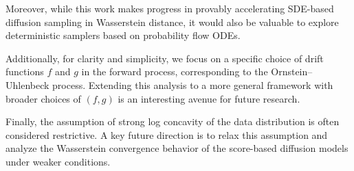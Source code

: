 \documentclass[11pt]{article}
\begin{document}
Moreover, while this work makes progress in provably accelerating SDE-based diffusion sampling in Wasserstein distance, it would also be valuable to explore deterministic samplers based on probability flow ODEs.

Additionally, for clarity and simplicity, we focus on a specific choice of drift functions $f$ and $g$ in the forward process, corresponding to the Ornstein–Uhlenbeck process. Extending this analysis to a more general framework with broader choices of $(f,g)$ is an interesting avenue for future research.

Finally, the assumption of strong log concavity of the data distribution is often considered restrictive. A key future direction is to relax this assumption and analyze the Wasserstein convergence behavior of the score-based diffusion models under weaker conditions.





\newpage


\newpage


\end{document}
